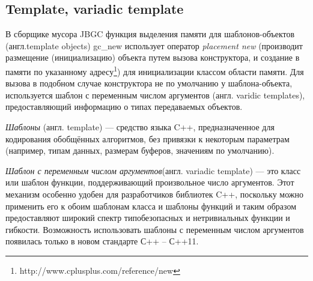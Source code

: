 \subsection{Template, variadic template} 

В сборщике мусора JBGC функция выделения памяти для шаблонов-объектов (англ.template objects) gc\_new  использует оператор \textit{placement new} (производит размещение (инициализацию) объекта путем вызова конструктора, и создание в памяти по указанному адресу\footnote{http://www.cplusplus.com/reference/new}) для инициализации классом области памяти. Для вызова в подобном случае конструктора не по умолчанию у шаблона-объекта,  используется шаблон с переменным числом аргументов (англ. varidic templates), предоставляющий информацию о типах передаваемых объектов.

\textit{Шаблоны} (англ. template) — средство языка C++, предназначенное для кодирования обобщённых алгоритмов, без привязки к некоторым параметрам (например, типам данных, размерам буферов, значениям по умолчанию). 

\textit{Шаблон с переменным числом аргументов}(англ. variadic template) — это класс или шаблон функции, поддерживающий произвольное число аргументов. Этот механизм особенно удобен для разработчиков библиотек C++, поскольку можно применить его к обоим шаблонам класса и шаблоны функций и таким образом предоставляют широкий спектр типобезопасных и нетривиальных функции и гибкости. Возможность использовать шаблоны с переменным числом аргументов появилась только в новом стандарте С++ -- С++11. 

